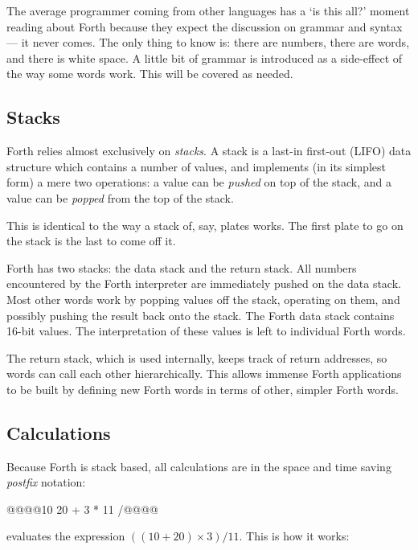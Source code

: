 The average programmer coming from other languages has a ‘is this all?’ moment
reading about Forth because they expect the discussion on grammar and syntax —
it never comes. The only thing to know is: there are numbers, there are words,
and there is white space. A little bit of grammar is introduced as a
side-effect of the way some words work. This will be covered as needed.

\subsection{Stacks}

Forth relies almost exclusively on {\em stacks}. A stack is a last-in first-out
(LIFO) data structure which contains a number of values, and implements (in its
simplest form) a mere two operations: a value can be {\em pushed\/} on top of
the stack, and a value can be {\em popped\/} from the top of the stack.

This is identical to the way a stack of, say, plates works. The first plate to
go on the stack is the last to come off it.

Forth has two stacks: the data stack and the return stack. All numbers
encountered by the Forth interpreter are immediately pushed on the data
stack. Most other words work by popping values off the stack, operating on
them, and possibly pushing the result back onto the stack. The Forth data stack
contains 16-bit values. The interpretation of these values is left to
individual Forth words.

The return stack, which is used internally, keeps track of return addresses, so
words can call each other hierarchically. This allows immense Forth
applications to be built by defining new Forth words in terms of other, simpler
Forth words.

\subsection{Calculations}

Because Forth is stack based, all calculations are in the space and time saving
{\em\gls{postfix}} notation:

\begin{intrcode}
@@@@10 20 + 3 * 11 /@@@@
\end{intrcode}

\noindent evaluates the expression $((10 + 20) \times 3) / 11$. This is how it
works:

